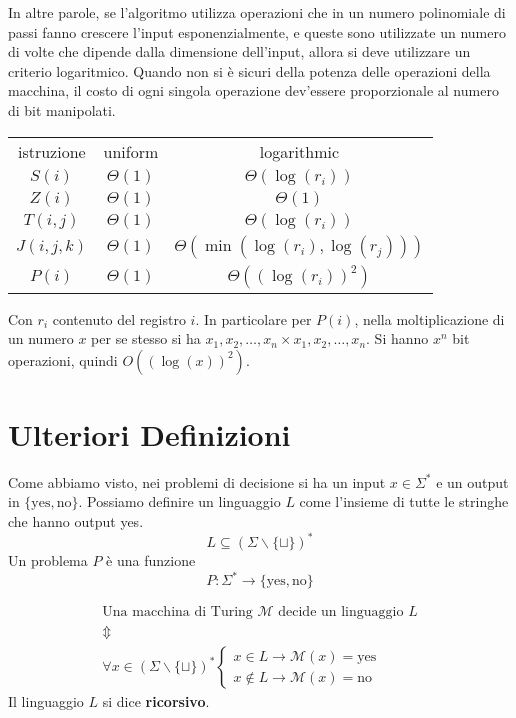 In altre parole, se l'algoritmo utilizza operazioni che in un numero polinomiale di passi fanno crescere l'input esponenzialmente, e queste sono utilizzate un numero di volte che dipende dalla dimensione dell'input, allora si deve utilizzare un criterio logaritmico. Quando non si è sicuri della potenza delle operazioni della macchina, il costo di ogni singola operazione dev'essere proporzionale al numero di bit manipolati.
\begin{table}[H]
    \centering
    \def\arraystretch{1.3}
    \begin{tabular}{ccc}
    \rowcolor[HTML]{C0C0C0} 
    istruzione & uniform     & logarithmic                        \\
    $S(i)$     & $\Theta(1)$ & $\Theta(\log(r_i))$                \\
    \rowcolor[HTML]{EFEFEF} 
    $Z(i)$     & $\Theta(1)$ & $\Theta(1)$                        \\
    $T(i,j)$   & $\Theta(1)$ & $\Theta(\log(r_i))$                \\
    \rowcolor[HTML]{EFEFEF} 
    $J(i,j,k)$ & $\Theta(1)$ & $\Theta(\min(\log(r_i),\log(r_j)))$\\
    $P(i)$     & $\Theta(1)$ & $\Theta((\log(r_i))^2)$            
    \end{tabular}
\end{table}
Con $r_i$ contenuto del registro $i$. In particolare per $P(i)$, nella moltiplicazione di un numero $x$ per se stesso si ha $x_1,x_2,\dots,x_n \times x_1,x_2,\dots,x_n$. Si hanno $x^n$ bit operazioni, quindi $O((\log(x))^2)$.



\section{Ulteriori Definizioni}
Come abbiamo visto, nei problemi di decisione si ha un input $x\in\Sigma^*$ e un output in $\{\text{yes},\text{no}\}$. Possiamo definire un linguaggio $L$ come l'insieme di tutte le stringhe che hanno output yes. 
$$
    L \subseteq (\Sigma \backslash \{ \sqcup \} )^*
$$
Un problema $P$ è una funzione
$$
    P:\Sigma^*\to\{\text{yes},\text{no}\}
$$

\begin{definition}
    \begin{eqnarray*}
        &\text{Una macchina di Turing $\mathcal{M}$ decide un linguaggio $L$}&\\
        &\Updownarrow&\\
        &\forall x\in(\Sigma\backslash\{\sqcup\})^* \begin{cases*}
            x\in L \to \mathcal{M}(x)=\text{yes}\\
            x\notin L \to \mathcal{M}(x)=\text{no}
        \end{cases*}&
    \end{eqnarray*}
    Il linguaggio $L$ si dice \textbf{ricorsivo}.
\end{definition}

